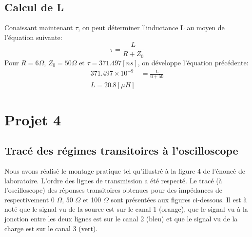 \subsection*{Calcul de L}

Conaissant maintenant $\tau$, on peut déterminer l'inductance L au moyen de l'équation suivante:
\begin{equation}
\tau = \frac{L}{R + Z_0}
\end{equation}
Pour $R = 6 \Omega$, $Z_0 = 50 \Omega$ et $\tau = 371.497\left[ns\right]$, on développe l'équation précédente:
\begin{align*}
371.497\times 10^{-9} &= \frac{L}{6 + 50}\\
L = 20.8 \left[\mu H\right]
\end{align*}
\newpage
\section{Projet 4}
\subsection{Tracé des régimes transitoires à l'oscilloscope}
\label{s:tracer_transitoire}
Nous avons réalisé le montage pratique tel qu'illustré à la figure 4 de l'énoncé de laboratoire. L'ordre des lignes de transmission a été respecté. Le tracé (à l'oscilloscope) des réponses transitoires obtenues pour des impédances de respectivement 0 $\Omega$, 50 $\Omega$ et 100 $\Omega$ sont présentées aux figures ci-dessous. Il est à noté que le signal vu de la source est sur le canal 1 (orange), que le signal vu à la jonction entre les deux lignes est sur le canal 2 (bleu) et que le signal vu de la charge est sur le canal 3 (vert).

